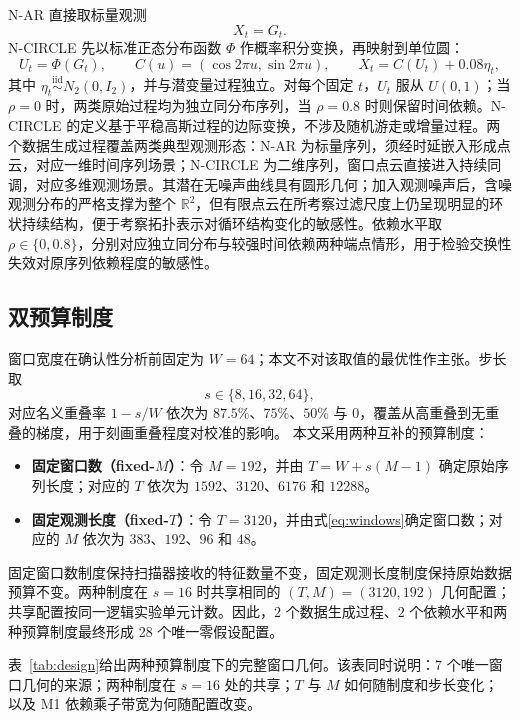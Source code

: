 N-AR 直接取标量观测
\begin{equation}\label{eq:n-ar}
 X_t=G_t.
\end{equation}
N-CIRCLE 先以标准正态分布函数 $\Phi$ 作概率积分变换，再映射到单位圆：
\begin{equation}\label{eq:n-circle}
 U_t=\Phi(G_t),\qquad
 C(u)=(\cos 2\pi u,\sin 2\pi u),\qquad
 X_t=C(U_t)+0.08\eta_t,
\end{equation}
其中 $\eta_t\overset{\mathrm{iid}}{\sim}N_2(0,I_2)$，并与潜变量过程独立。对每个固定 $t$，$U_t$ 服从 $U(0,1)$；当 $\rho=0$ 时，两类原始过程均为独立同分布序列，当 $\rho=0.8$ 时则保留时间依赖。N-CIRCLE 的定义基于平稳高斯过程的边际变换，不涉及随机游走或增量过程。两个数据生成过程覆盖两类典型观测形态：N-AR 为标量序列，须经时延嵌入形成点云，对应一维时间序列场景；N-CIRCLE 为二维序列，窗口点云直接进入持续同调，对应多维观测场景。其潜在无噪声曲线具有圆形几何；加入观测噪声后，含噪观测分布的严格支撑为整个 $\mathbb R^2$，但有限点云在所考察过滤尺度上仍呈现明显的环状持续结构，便于考察拓扑表示对循环结构变化的敏感性。依赖水平取 $\rho\in\{0,0.8\}$，分别对应独立同分布与较强时间依赖两种端点情形，用于检验交换性失效对原序列依赖程度的敏感性。

\subsection{双预算制度}\label{sec:budget}

窗口宽度在确认性分析前固定为 $W=64$；本文不对该取值的最优性作主张。步长取
\[
 s\in\{8,16,32,64\},
\]
对应名义重叠率 $1-s/W$ 依次为 $87.5\%$、$75\%$、$50\%$ 与 $0$，覆盖从高重叠到无重叠的梯度，用于刻画重叠程度对校准的影响。
本文采用两种互补的预算制度：
\begin{itemize}
\item \textbf{固定窗口数（fixed-$M$）}：令 $M=192$，并由 $T=W+s(M-1)$ 确定原始序列长度；对应的 $T$ 依次为 $1592$、$3120$、$6176$ 和 $12288$。
\item \textbf{固定观测长度（fixed-$T$）}：令 $T=3120$，并由式\eqref{eq:windows}确定窗口数；对应的 $M$ 依次为 $383$、$192$、$96$ 和 $48$。
\end{itemize}
固定窗口数制度保持扫描器接收的特征数量不变，固定观测长度制度保持原始数据预算不变。两种制度在 $s=16$ 时共享相同的 $(T,M)=(3120,192)$ 几何配置；共享配置按同一逻辑实验单元计数。因此，$2$ 个数据生成过程、$2$ 个依赖水平和两种预算制度最终形成 28 个唯一零假设配置。

表~\ref{tab:design}给出两种预算制度下的完整窗口几何。该表同时说明：7 个唯一窗口几何的来源；两种制度在 $s=16$ 处的共享；$T$ 与 $M$ 如何随制度和步长变化；以及 M1 依赖乘子带宽为何随配置改变。

